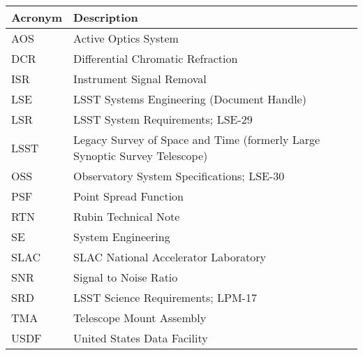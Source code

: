 \addtocounter{table}{-1}
\begin{longtable}{p{}p{}}\hline
\textbf{Acronym} & \textbf{Description}  \\\hline

AOS & Active Optics System \\\hline
DCR & Differential Chromatic Refraction \\\hline
ISR & Instrument Signal Removal \\\hline
LSE & LSST Systems Engineering (Document Handle) \\\hline
LSR & LSST System Requirements; LSE-29 \\\hline
LSST & Legacy Survey of Space and Time (formerly Large Synoptic Survey Telescope) \\\hline
OSS & Observatory System Specifications; LSE-30 \\\hline
PSF & Point Spread Function \\\hline
RTN & Rubin Technical Note \\\hline
SE & System Engineering \\\hline
SLAC & SLAC National Accelerator Laboratory \\\hline
SNR & Signal to Noise Ratio \\\hline
SRD & LSST Science Requirements; LPM-17 \\\hline
TMA & Telescope Mount Assembly \\\hline
USDF & United States Data Facility \\\hline
\end{longtable}
